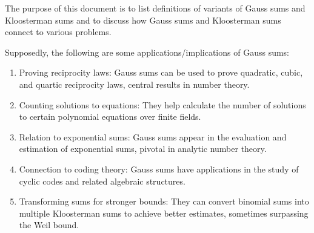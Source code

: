 
The purpose of this document is to list definitions of variants of Gauss sums and Kloosterman sums and to discuss how Gauss sums and Kloosterman sums connect to various problems.

Supposedly, the following are some applications/implications of Gauss sums:

\begin{enumerate}
  \item Proving reciprocity laws: Gauss sums can be used to prove quadratic, cubic, and quartic reciprocity laws, central results in number theory.
  \item Counting solutions to equations: They help calculate the number of solutions to certain polynomial equations over finite fields.
  \item Relation to exponential sums: Gauss sums appear in the evaluation and estimation of exponential sums, pivotal in analytic number theory.
  \item Connection to coding theory: Gauss sums have applications in the study of cyclic codes and related algebraic structures.
  \item Transforming sums for stronger bounds: They can convert binomial sums into multiple Kloosterman sums to achieve better estimates, sometimes surpassing the Weil bound.
\end{enumerate}

